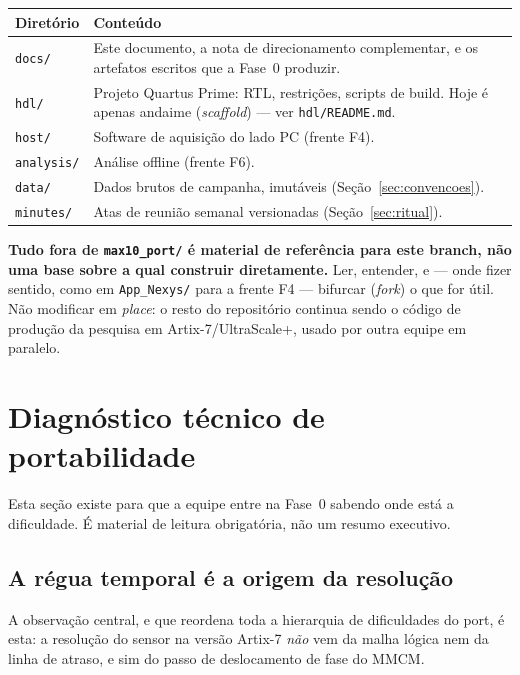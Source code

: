 \documentclass[11pt,a4paper]{article}
\begin{document}
\begin{center}
\begin{tabularx}{\textwidth}{@{}L{2.2cm} X@{}}
\toprule
\textbf{Diretório} & \textbf{Conteúdo} \\
\midrule
\texttt{docs/} & Este documento, a nota de direcionamento complementar, e os
artefatos escritos que a Fase~0 produzir. \\
\texttt{hdl/} & Projeto Quartus Prime: RTL, restrições, scripts de build. Hoje é
apenas andaime (\emph{scaffold}) --- ver \texttt{hdl/README.md}. \\
\texttt{host/} & Software de aquisição do lado PC (frente F4). \\
\texttt{analysis/} & Análise offline (frente F6). \\
\texttt{data/} & Dados brutos de campanha, imutáveis (Seção~\ref{sec:convencoes}). \\
\texttt{minutes/} & Atas de reunião semanal versionadas (Seção~\ref{sec:ritual}). \\
\bottomrule
\end{tabularx}
\end{center}

\textbf{Tudo fora de \texttt{max10\_port/} é material de referência para este
branch, não uma base sobre a qual construir diretamente.} Ler, entender, e --- onde
fizer sentido, como em \texttt{App\_Nexys/} para a frente F4 --- bifurcar
(\emph{fork}) o que for útil. Não modificar em \emph{place}: o resto do repositório
continua sendo o código de produção da pesquisa em Artix-7/UltraScale+, usado por
outra equipe em paralelo.

\section{Diagnóstico técnico de portabilidade}
\label{sec:portabilidade}

Esta seção existe para que a equipe entre na Fase~0 sabendo onde está a dificuldade.
É material de leitura obrigatória, não um resumo executivo.

\subsection{A régua temporal é a origem da resolução}

A observação central, e que reordena toda a hierarquia de dificuldades do port, é
esta: a resolução do sensor na versão Artix-7 \emph{não} vem da malha lógica nem da
linha de atraso, e sim do passo de deslocamento de fase do MMCM.
\end{document}
